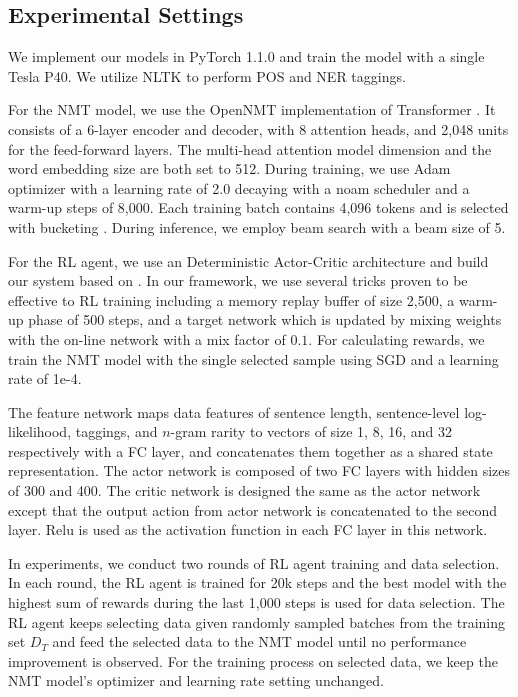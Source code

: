 \documentclass[letterpaper]{article}
\begin{document}
\subsection{Experimental Settings}
We implement our models in PyTorch 1.1.0 \cite{paszke2017pytorch} and train the model with a single Tesla P40. We utilize NLTK \cite{bird2009natural} to perform POS and NER taggings.

For the NMT model, we use the OpenNMT implementation \cite{opennmt} of Transformer \cite{vaswani2017attention}. It consists of a 6-layer encoder and decoder, with 8 attention heads, and 2,048 units for the feed-forward layers. The multi-head attention model dimension and the word embedding size are both set to 512. During training, we use Adam optimizer \cite{kingma2015adam} with a learning rate of 2.0 decaying with a noam scheduler and a warm-up steps of 8,000. Each training batch contains 4,096 tokens and is selected with bucketing \cite{kocmi2017curriculum}. During inference, we employ beam search with a beam size of 5. 

For the RL agent, we use an Deterministic Actor-Critic architecture and build our system based on \cite{deeprl}. In our framework, we use several tricks proven to be effective to RL training including a memory replay buffer of size 2,500, a warm-up phase of 500 steps, and a target network which is updated by mixing weights with the on-line network with a mix factor of $0.1$. For calculating rewards, we train the NMT model with the single selected sample using SGD and a learning rate of 1e-4.

The feature network maps data features of sentence length, sentence-level log-likelihood, taggings, and $n$-gram rarity to vectors of size 1, 8, 16, and 32 respectively with a FC layer, and concatenates them together as a shared state representation. The actor network is composed of two FC layers with hidden sizes of 300 and 400. The critic network is designed the same as the actor network except that the output action from actor network is concatenated to the second layer. Relu is used as the activation function in each FC layer in this network.

In experiments, we conduct two rounds of RL agent training and data selection. In each round, the RL agent is trained for 20k steps and the best model with the highest sum of rewards during the last 1,000 steps is used for data selection. The RL agent keeps selecting data given randomly sampled batches from the training set $D_T$ and feed the selected data to the NMT model until no performance improvement is observed. For the training process on selected data, we keep the NMT model's optimizer and learning rate setting unchanged.
\end{document}
